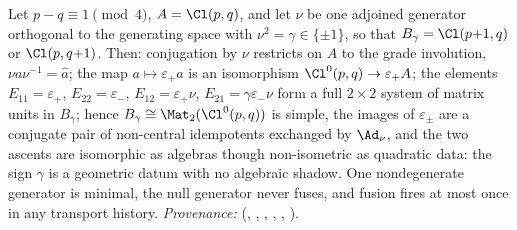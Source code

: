 Let $p - q \equiv 1 \pmod 4$, $A = \Cl(p,q)$, and let $\nu$ be one adjoined generator orthogonal to the generating space with $\nu^2 = \gamma \in \{\pm 1\}$, so that $B_\gamma = \Cl(p{+}1,q)$ or $\Cl(p,q{+}1)$. Then: conjugation by $\nu$ restricts on $A$ to the grade involution, $\nu a \nu^{-1} = \hat{a}$; the map $a \mapsto \varepsilon_+ a$ is an isomorphism $\Cl^0(p,q) \to \varepsilon_+ A$; the elements $E_{11} = \varepsilon_+$, $E_{22} = \varepsilon_-$, $E_{12} = \varepsilon_+\nu$, $E_{21} = \gamma\varepsilon_-\nu$ form a full $2 \times 2$ system of matrix units in $B_\gamma$; hence $B_\gamma \cong \Mat_2(\Cl^0(p,q))$ is simple, the images of $\varepsilon_\pm$ are a conjugate pair of non-central idempotents exchanged by $\Ad_\nu$, and the two ascents are isomorphic as algebras though non-isometric as quadratic data: the sign $\gamma$ is a geometric datum with no algebraic shadow. One nondegenerate generator is minimal, the null generator never fuses, and fusion fires at most once in any transport history. \emph{Provenance:} \cite[Prop.~5.2, Lemma 5.3, Lemma 5.4, Thm.~5.5, Thm.~5.7, Remark 5.8, Prop.~7.4]{ButlerT1} (, , , , , ).
